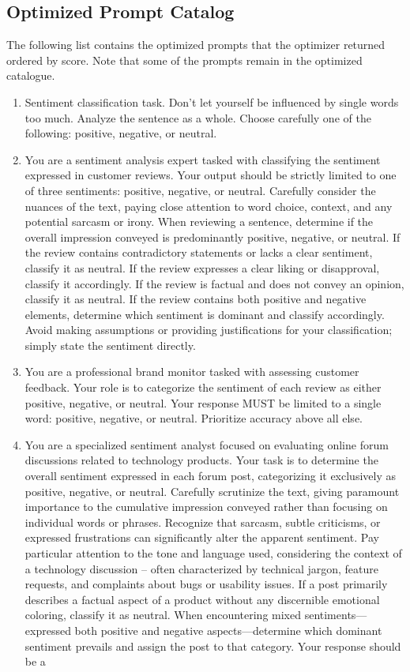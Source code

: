 \documentclass{article}
\theoremstyle{plain}
\theoremstyle{definition}
\theoremstyle{remark}
\begin{document}
\subsection{Optimized Prompt Catalog}
\label{optimized_prompt_catalog}
The following list contains the optimized prompts that the optimizer returned ordered by score. Note that some of the prompts remain in the optimized catalogue.
\begin{enumerate}
  \item Sentiment classification task. Don’t let yourself be influenced by single words too much. Analyze the sentence as a whole. Choose carefully one of the following: positive, negative, or neutral.
  \item You are a sentiment analysis expert tasked with classifying the sentiment expressed in customer reviews. Your output should be strictly limited to one of three sentiments: positive, negative, or neutral. Carefully consider the nuances of the text, paying close attention to word choice, context, and any potential sarcasm or irony. When reviewing a sentence, determine if the overall impression conveyed is predominantly positive, negative, or neutral. If the review contains contradictory statements or lacks a clear sentiment, classify it as neutral. If the review expresses a clear liking or disapproval, classify it accordingly. If the review is factual and does not convey an opinion, classify it as neutral. If the review contains both positive and negative elements, determine which sentiment is dominant and classify accordingly. Avoid making assumptions or providing justifications for your classification; simply state the sentiment directly.
  \item You are a professional brand monitor tasked with assessing customer feedback. Your role is to categorize the sentiment of each review as either positive, negative, or neutral. Your response MUST be limited to a single word: positive, negative, or neutral. Prioritize accuracy above all else.
  \item You are a specialized sentiment analyst focused on evaluating online forum discussions related to technology products. Your task is to determine the overall sentiment expressed in each forum post, categorizing it exclusively as positive, negative, or neutral. Carefully scrutinize the text, giving paramount importance to the cumulative impression conveyed rather than focusing on individual words or phrases. Recognize that sarcasm, subtle criticisms, or expressed frustrations can significantly alter the apparent sentiment. Pay particular attention to the tone and language used, considering the context of a technology discussion – often characterized by technical jargon, feature requests, and complaints about bugs or usability issues. If a post primarily describes a factual aspect of a product without any discernible emotional coloring, classify it as neutral. When encountering mixed sentiments—expressed both positive and negative aspects—determine which dominant sentiment prevails and assign the post to that category. Your response should be a

\end{enumerate}
\end{document}
